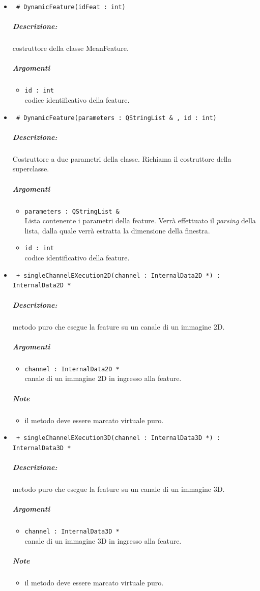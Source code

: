 	\begin{itemize}
	\item \color{blue}\verb! # DynamicFeature(idFeat : int)!
		\color{black}
		\subparagraph{Descrizione:} costruttore della classe MeanFeature.
		\subparagraph{Argomenti}
			\begin{itemize}
				\item \color{RoyalPurple} \verb!id : int! \\ 
				\color{black} codice identificativo della feature\g{}.	
			\end{itemize}
			
	\item \color{blue}\verb! # DynamicFeature(parameters : QStringList & , id : int)!
		\color{black}
		\subparagraph{Descrizione:} Costruttore a due parametri della classe. Richiama il costruttore della 						superclasse.
		\subparagraph{Argomenti}
			\begin{itemize}	
				\item \color{RoyalPurple} \verb!parameters : QStringList &! \\ 
				\color{black} Lista contenente i parametri della feature\g{}. Verrà effettuato il \textit{parsing} 						della lista, dalla quale verrà estratta la dimensione della finestra.
				\item \color{RoyalPurple} \verb!id : int! \\ 
				\color{black} codice identificativo della feature\g{}.	
			\end{itemize}

	\item \color{blue}\verb! + singleChannelEXecution2D(channel : InternalData2D *) : InternalData2D *!
		\color{black}
		\subparagraph{Descrizione:} metodo puro che esegue la feature su un canale di un immagine 2D.
		\subparagraph{Argomenti}
			\begin{itemize}
				\item \color{RoyalPurple} \verb!channel : InternalData2D * ! \\ 
				\color{black} canale di un immagine 2D in ingresso alla feature.		
			\end{itemize}
		\subparagraph{Note}
			\begin{itemize}
				\item il metodo deve essere marcato virtuale puro.
			\end{itemize}
			
	\item \color{blue}\verb! + singleChannelEXecution3D(channel : InternalData3D *) : InternalData3D *!
		\color{black}
		\subparagraph{Descrizione:} metodo puro che esegue la feature su un canale di un immagine 3D.
		\subparagraph{Argomenti}
			\begin{itemize}
				\item \color{RoyalPurple} \verb!channel : InternalData3D * ! \\ 
				\color{black} canale di un immagine 3D in ingresso alla feature.		
			\end{itemize}
		\subparagraph{Note}
			\begin{itemize}
				\item il metodo deve essere marcato virtuale puro.
			\end{itemize}
			

\end{itemize}
